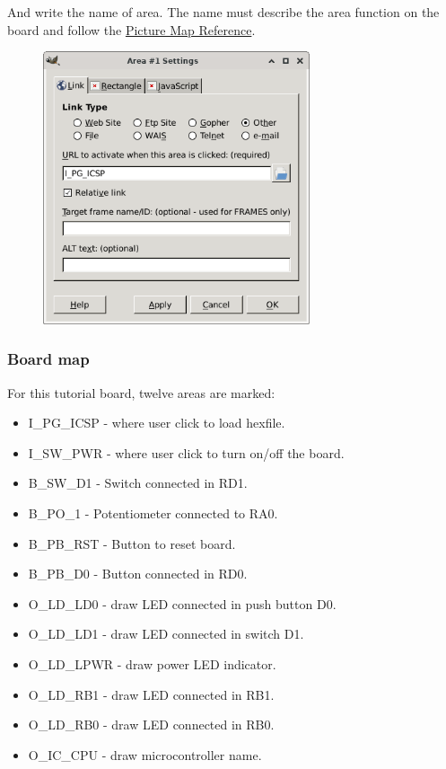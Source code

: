 And write the name of area. The name must describe the area function on the board 
and follow the \hyperlink{def:map}{Picture Map Reference}.

\begin{figure}[H]
\center
\includegraphics[width=0.7\textwidth]{img/hb/gimp05.png} 
\end{figure} 


\subsubsection{Board map}

For this tutorial board, twelve areas are marked:
\begin{itemize}
\item I\_PG\_ICSP - where user click to load hexfile.
\item I\_SW\_PWR - where user click to turn on/off the board.
\item B\_SW\_D1 - Switch connected in RD1.
\item B\_PO\_1 - Potentiometer connected to RA0.
\item B\_PB\_RST - Button to reset board.
\item B\_PB\_D0 - Button connected in RD0. 
\item O\_LD\_LD0 - draw LED connected in push button D0.
\item O\_LD\_LD1 - draw LED connected in switch D1.
\item O\_LD\_LPWR - draw power LED indicator.
\item O\_LD\_RB1  - draw LED connected in RB1.
\item O\_LD\_RB0  - draw LED connected in RB0.
\item O\_IC\_CPU  - draw microcontroller name.
\end{itemize}


